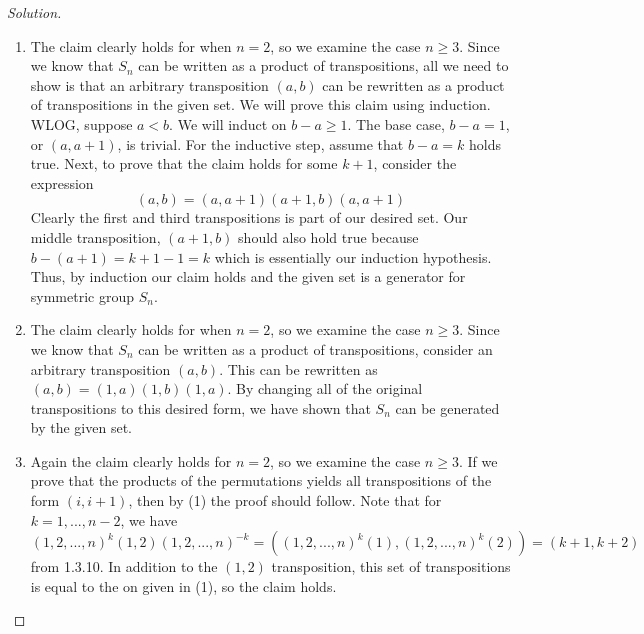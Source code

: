 \documentclass[11 pt]{article}
\theoremstyle{definition}
\theoremstyle{remark}
\newenvironment{solution}
  {\renewcommand\qedsymbol{$\blacksquare$}\begin{proof}[Solution]}
  {\end{proof}}
\begin{document}
\begin{solution}
\begin{enumerate}
    \item The claim clearly holds for when $n=2$, so we examine the case $n \geq 3$. Since we know that $S_n$ can be written as a product of transpositions, all we need to show is that an arbitrary transposition $(a,b)$ can be rewritten as a product of transpositions in the given set. We will prove this claim using induction. WLOG, suppose $a < b$. We will induct on $b-a \geq 1$. The base case, $b-a=1$, or $(a,a+1)$, is trivial. For the inductive step, assume that $b-a=k$ holds true. Next, to prove that the claim holds for some $k+1$, consider the expression
    $$(a,b) = (a,a+1)(a+1,b)(a,a+1)$$
    Clearly the first and third transpositions is part of our desired set. Our middle transposition, $(a+1,b)$ should also hold true because $b-(a+1) = k+1-1=k$ which is essentially our induction hypothesis. Thus, by induction our claim holds and the given set is a generator for symmetric group $S_n$.
    
    \item The claim clearly holds for when $n=2$, so we examine the case $n \geq 3$. Since we know that $S_n$ can be written as a product of transpositions, consider an arbitrary transposition $(a,b)$. This can be rewritten as $(a,b) = (1,a)(1,b)(1,a)$. By changing all of the original transpositions to this desired form, we have shown that $S_n$ can be generated by the given set.
    
    \item Again the claim clearly holds for $n=2$, so we examine the case $n \geq 3$. If we prove that the products of the permutations yields all transpositions of the form $(i,i+1)$, then by (1) the proof should follow. Note that for $k = 1,...,n-2$, we have $(1,2,...,n)^k(1,2)(1,2,...,n)^{-k} = ((1,2,...,n)^k(1), (1,2,...,n)^k(2)) = (k+1,k+2)$ from 1.3.10. In addition to the $(1,2)$ transposition, this set of transpositions is equal to the on given in (1), so the claim holds.
\end{enumerate}
\end{solution}

\end{document}
